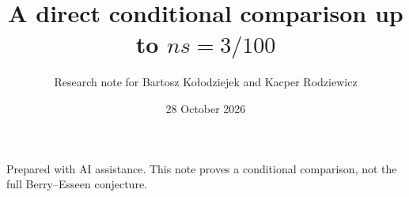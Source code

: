 \documentclass[11pt,a4paper]{article}
\begin{document}
\title{A direct conditional comparison up to $ns=3/100$}
\author{Research note for Bartosz Ko{\l}odziejek and Kacper Rodziewicz}
\date{28 October 2026}
\maketitle
\noindent Prepared with AI assistance. This note proves a conditional comparison,
not the full Berry--Esseen conjecture.

\end{document}
